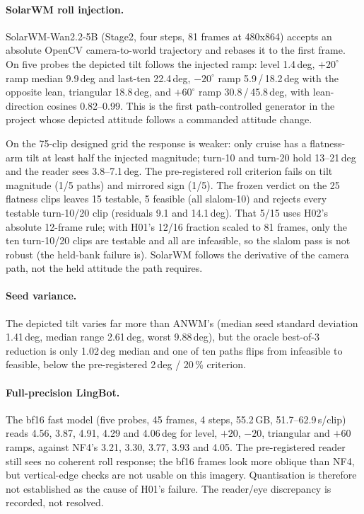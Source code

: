 \paragraph{SolarWM roll injection.}
SolarWM-Wan2.2-5B (Stage2, four steps, 81 frames at 480x864) accepts an absolute OpenCV
camera-to-world trajectory and rebases it to the first frame. On five probes the depicted
tilt follows the injected ramp: level 1.4\,deg, $+20^\circ$ ramp median 9.9\,deg and last-ten
22.4\,deg, $-20^\circ$ ramp 5.9\,/\,18.2\,deg with the opposite lean, triangular 18.8\,deg, and
$+60^\circ$ ramp 30.8\,/\,45.8\,deg, with lean-direction cosines 0.82--0.99. This is the first
path-controlled generator in the project whose depicted attitude follows a commanded attitude
change.

On the 75-clip designed grid the response is weaker: only cruise has a flatness-arm tilt at
least half the injected magnitude; turn-10 and turn-20 hold 13--21\,deg and the reader sees
3.8--7.1\,deg. The pre-registered roll criterion fails on tilt magnitude (1/5 paths) and
mirrored sign (1/5). The frozen verdict on the 25 flatness clips leaves 15 testable, 5 feasible
(all slalom-10) and rejects every testable turn-10/20 clip (residuals 9.1 and 14.1\,deg).
That 5/15 uses H02's absolute 12-frame rule; with H01's 12/16 fraction scaled to 81 frames,
only the ten turn-10/20 clips are testable and all are infeasible, so the slalom pass is not
robust (the held-bank failure is).
SolarWM follows the derivative of the camera path, not the held attitude the path requires.

\paragraph{Seed variance.}
The depicted tilt varies far more than ANWM's (median seed
standard deviation 1.41\,deg, median range 2.61\,deg, worst 9.88\,deg), but the oracle
best-of-3 reduction is only 1.02\,deg median and one of ten paths flips from infeasible to
feasible, below the pre-registered 2\,deg / 20\,\% criterion.

\paragraph{Full-precision LingBot.}
The bf16 fast model (five probes, 45 frames, 4 steps, 55.2\,GB, 51.7--62.9\,s/clip) reads 4.56,
3.87, 4.91, 4.29 and 4.06\,deg for level, $+20$, $-20$, triangular and $+60$ ramps, against
NF4's 3.21, 3.30, 3.77, 3.93 and 4.05. The pre-registered reader still sees no coherent roll
response; the bf16 frames look more oblique than NF4, but vertical-edge checks are not usable
on this imagery. Quantisation is therefore not established as the cause of H01's failure.
The reader/eye discrepancy is recorded, not resolved.

